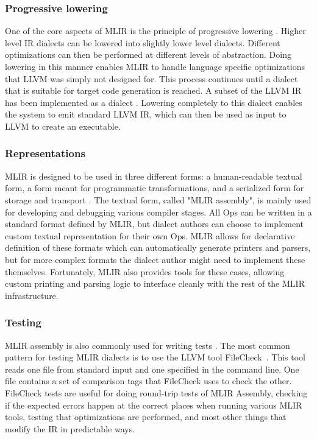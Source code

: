 \subsubsection{Progressive lowering}
One of the core aspects of MLIR is the principle of progressive lowering \cite{mlir}. Higher level IR dialects can be lowered into slightly lower level dialects. Different optimizations can then be performed at different levels of abstraction. Doing lowering in this manner enables MLIR to handle language specific optimizations that LLVM was simply not designed for. This process continues until a dialect that is suitable for target code generation is reached. A subset of the LLVM IR has been implemented as a dialect \cite{mlir_llvm_dialect, mlir}. Lowering completely to this dialect enables the system to emit standard LLVM IR, which can then be used as input to LLVM to create an executable.

\subsubsection{Representations}
MLIR is designed to be used in three different forms: a human-readable textual form, a form meant for programmatic transformations, and a serialized form for storage and transport \cite{mlir_lang_ref}. The textual form, called "MLIR assembly", is mainly used for developing and debugging various compiler stages. All Ops can be written in a standard format defined by MLIR, but dialect authors can choose to implement custom textual representation for their own Ops. MLIR allows for declarative definition of these formats which can automatically generate printers and parsers, but for more complex formats the dialect author might need to implement these themselves. Fortunately, MLIR also provides tools for these cases, allowing custom printing and parsing logic to interface cleanly with the rest of the MLIR infrastructure. 

\subsubsection{Testing}
MLIR assembly is also commonly used for writing tests \cite{mlir_testing_guide}. The most common pattern for testing MLIR dialects is to use the LLVM tool FileCheck~\cite{mlir_testing_guide}. This tool reads one file from standard input and one specified in the command line. One file contains a set of comparison tags that FileCheck uses to check the other. FileCheck tests are useful for doing round-trip tests of MLIR Assembly, checking if the expected errors happen at the correct places when running various MLIR tools, testing that optimizations are performed, and most other things that modify the IR in predictable ways.


